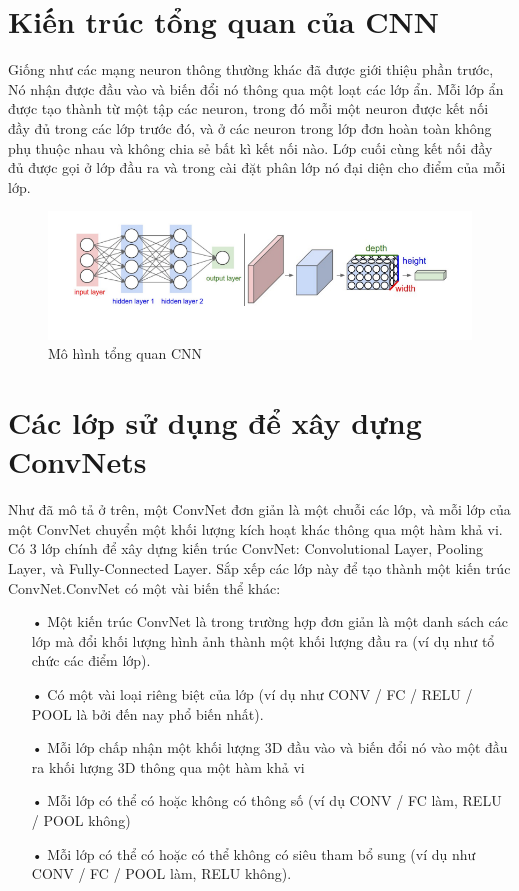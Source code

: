 \documentclass[a4paper,12pt]{report}
\begin{document}
\section{Kiến trúc tổng quan của CNN}
Giống như các mạng neuron thông thường khác đã được giới thiệu phần trước, Nó nhận được đầu vào và biến đổi nó thông qua một loạt các lớp ẩn. Mỗi lớp ẩn được tạo thành từ một tập các neuron, trong đó mỗi một neuron được kết nối đầy đủ trong các lớp trước đó, và ở các neuron trong lớp đơn hoàn toàn không phụ thuộc nhau và không chia sẻ bất kì kết nối nào. Lớp cuối cùng kết nối đầy đủ được gọi ở lớp đầu ra và trong cài đặt phân lớp nó đại diện cho điểm của mỗi lớp.
\begin{figure}[H]
\includegraphics[scale=0.7]{img1.png}
\caption{Mô hình tổng quan CNN}
\end{figure}
\section{Các lớp sử dụng để xây dựng ConvNets}
Như đã mô tả ở trên, một ConvNet đơn giản là một chuỗi các lớp, và mỗi lớp của một ConvNet chuyển một khối lượng kích hoạt khác thông qua một hàm khả vi. Có 3 lớp chính để xây dựng kiến trúc ConvNet: Convolutional Layer, Pooling Layer, và Fully-Connected Layer. Sắp xếp các lớp này để tạo thành một kiến trúc ConvNet.ConvNet có một vài biến thể khác:
\begin{itemize}
\item[•] Một kiến trúc ConvNet là trong trường hợp đơn giản là một danh sách các lớp mà đổi khối lượng hình ảnh thành một khối lượng đầu ra (ví dụ như tổ chức các điểm lớp).
\item[•] Có một vài loại riêng biệt của lớp (ví dụ như CONV / FC / RELU / POOL là bởi đến nay phổ biến nhất).
\item[•] Mỗi lớp chấp nhận một khối lượng 3D đầu vào và biến đổi nó vào một đầu ra khối lượng 3D thông qua một hàm khả vi
\item[•] Mỗi lớp có thể có hoặc không có thông số (ví dụ CONV / FC làm, RELU / POOL không)
\item[•] Mỗi lớp có thể có hoặc có thể không có siêu tham bổ sung (ví dụ như CONV / FC / POOL làm, RELU không).
\end{itemize}
\end{document}
